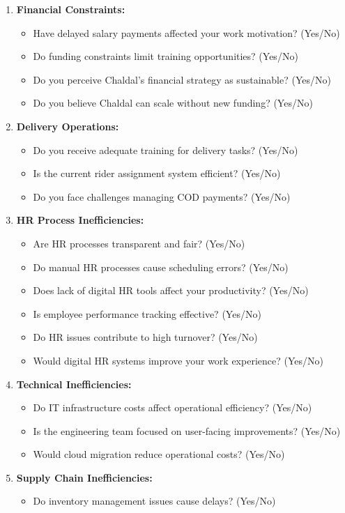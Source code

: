 \documentclass[12pt,a4paper]{article}
\begin{document}
\begin{enumerate}
    \item \textbf{Financial Constraints:}
    \begin{itemize}
        \item Have delayed salary payments affected your work motivation? (Yes/No)
        \item Do funding constraints limit training opportunities? (Yes/No)
        \item Do you perceive Chaldal’s financial strategy as sustainable? (Yes/No)
        \item Do you believe Chaldal can scale without new funding? (Yes/No)
    \end{itemize}
    \item \textbf{Delivery Operations:}
    \begin{itemize}
        \item Do you receive adequate training for delivery tasks? (Yes/No)
        \item Is the current rider assignment system efficient? (Yes/No)
        \item Do you face challenges managing COD payments? (Yes/No)
    \end{itemize}
    \item \textbf{HR Process Inefficiencies:}
    \begin{itemize}
        \item Are HR processes transparent and fair? (Yes/No)
        \item Do manual HR processes cause scheduling errors? (Yes/No)
        \item Does lack of digital HR tools affect your productivity? (Yes/No)
        \item Is employee performance tracking effective? (Yes/No)
        \item Do HR issues contribute to high turnover? (Yes/No)
        \item Would digital HR systems improve your work experience? (Yes/No)
    \end{itemize}
    \item \textbf{Technical Inefficiencies:}
    \begin{itemize}
        \item Do IT infrastructure costs affect operational efficiency? (Yes/No)
        \item Is the engineering team focused on user-facing improvements? (Yes/No)
        \item Would cloud migration reduce operational costs? (Yes/No)
    \end{itemize}
    \item \textbf{Supply Chain Inefficiencies:}
    \begin{itemize}
        \item Do inventory management issues cause delays? (Yes/No)
    \end{itemize}
\end{enumerate}
\end{document}
